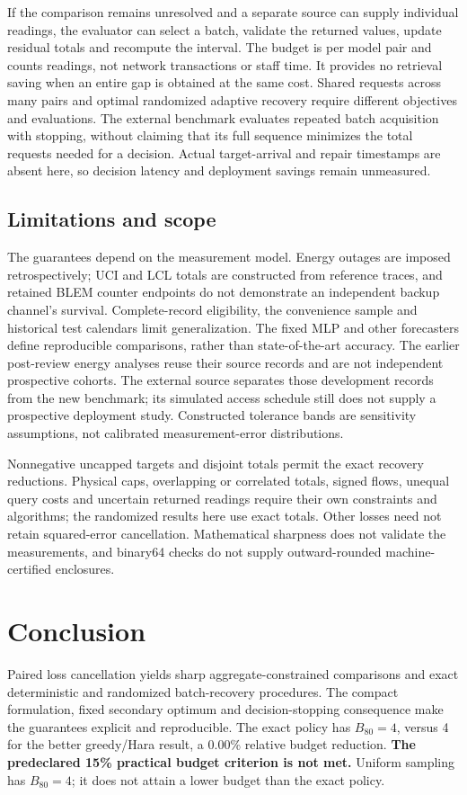 \documentclass[12pt]{article}
\begin{document}
If the comparison remains unresolved and a separate source can supply
individual readings, the evaluator can select a batch, validate the returned
values, update residual totals and recompute the interval. The budget is
per model pair and counts readings, not network transactions or staff time.
It provides no retrieval saving when an entire gap is obtained at the same
cost. Shared requests across many pairs and optimal randomized adaptive recovery
require different objectives and evaluations. The external benchmark evaluates
repeated batch acquisition with stopping, without claiming that its full
sequence minimizes the total requests needed for a decision. Actual target-arrival and repair timestamps are absent here,
so decision latency and deployment savings remain unmeasured.

\subsection{Limitations and scope}
The guarantees depend on the measurement model. Energy outages are imposed
retrospectively; UCI and LCL totals are constructed from reference traces, and retained
BLEM counter endpoints do not demonstrate an independent backup channel's
survival. Complete-record eligibility, the convenience sample and historical
test calendars limit generalization. The fixed MLP and other forecasters
define reproducible comparisons, rather than state-of-the-art accuracy.
The earlier post-review energy analyses reuse their source records and are
not independent prospective cohorts. The external source separates those
development records from the new benchmark; its simulated access schedule
still does not supply a prospective deployment study. Constructed tolerance bands are sensitivity assumptions, not
calibrated measurement-error distributions.

Nonnegative uncapped targets and disjoint totals permit the exact recovery
reductions. Physical caps, overlapping or correlated totals, signed flows,
unequal query costs and uncertain returned readings require their own
constraints and algorithms; the randomized results here use exact totals.
Other losses need not retain squared-error cancellation. Mathematical
sharpness does not validate the measurements, and binary64 checks do not
supply outward-rounded machine-certified enclosures.

\FloatBarrier
\section{Conclusion}
Paired loss cancellation yields sharp aggregate-constrained comparisons and exact deterministic and randomized batch-recovery procedures. The compact formulation, fixed secondary optimum and decision-stopping consequence make the guarantees explicit and reproducible. The exact policy has $B_{80}=4$, versus 4 for the better greedy/Hara result, a 0.00\% relative budget reduction. \textbf{The predeclared 15\% practical budget criterion is not met.} Uniform sampling has $B_{80}=4$; it does not attain a lower budget than the exact policy.
\end{document}
